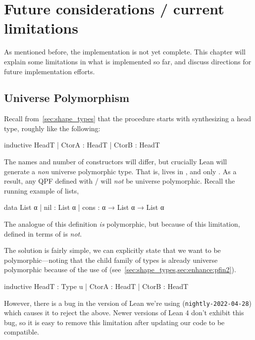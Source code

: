 
\chapter{Future considerations / current limitations}%
\label{ch:limitations}


As mentioned before, the implementation is not yet complete.
This chapter will explain some limitations in what is implemented so far, and discuss
directions for future implementation efforts.

\section{Universe Polymorphism}

Recall from~\cref{sec:shape_types} that the procedure starts with synthesizing a head type, roughly like the following:
\begin{leancode}
  inductive HeadT
    | CtorA : HeadT
    | CtorB : HeadT
\end{leancode}
The names and number of constructors will differ, but crucially Lean will generate a \emph{non} universe 
polymorphic type. That is,  lives in , and only .
As a result, any QPF defined with \data{}/\codata{} will \emph{not} be universe polymorphic.
Recall the running example of lists,
\begin{leancode}
  data List α 
    | nil  : List α
    | cons : α → List α → List α
\end{leancode}

The \inductive{} analogue of this definition \emph{is} polymorphic, but because of this limitation,
 defined in terms of \data{} is \emph{not}.
  

The solution is fairly simple, we can explicitly state that we want  to be polymorphic---noting that the child family of types is already universe polymorphic because of the use of  (see~\cref{sec:shape_types,sec:enhance:pfin2}).
\begin{badleancode}

  inductive HeadT : Type u
    | CtorA : HeadT
    | CtorB : HeadT

\end{badleancode}

However, there is a bug in the version of Lean we're using (\texttt{nightly-2022-04-28}) 
which causes it to reject the above. 
Newer versions of Lean 4 don't exhibit this bug, so it is easy to remove this limitation after updating
our code to be compatible.



